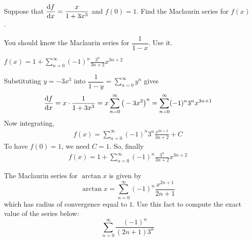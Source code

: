 \begin{Mquestion}[M105 2015A]\label{prob_s3.6modify2}
Suppose that $\displaystyle\diff{f}{x}=\frac{x}{1+3x^3}$ and $f(0)=1$.
Find the Maclaurin series for $f(x)$.
\end{Mquestion}

\begin{hint}
You should know the Maclaurin series for $\dfrac{1}{1-x}$. Use it.
\end{hint}

\begin{answer}
$f(x)  = 1+ \displaystyle\sum\limits_{n=0}^\infty (-1)^n  \frac{3^n }{3n+2} x^{3n+2}$
\end{answer}

\begin{solution}
Substituting $y=-3x^3$ into $\dfrac{1}{1-y} = \sum\limits_{n=0}^\infty y^n$
gives
\begin{align*}
\diff{f}{x} = x\cdot\frac{1}{1+3x^3}
=x\sum_{n=0}^\infty {\big(-3x^3\big)}^n
=\sum_{n=0}^\infty (-1)^n 3^n x^{3n+1}
\end{align*}
Now integrating,
\begin{align*}
f(x)  = \sum_{n=0}^\infty (-1)^n 3^n \frac{x^{3n+2}}{3n+2} +C
\end{align*}
To have $f(0)=1$, we need $C=1$. So, finally
\begin{align*}
f(x)  = 1+ \sum_{n=0}^\infty (-1)^n  \frac{3^n }{3n+2} x^{3n+2}
\end{align*}
\end{solution}


\begin{Mquestion}[M105 2012A]\label{prob_s3.6evaluate1}
The Maclaurin series for $\arctan x$ is given by
\begin{equation*}
\arctan x = \sum_{n=0}^\infty (-1)^n\frac{x^{2n+1}}{2n+1}
\end{equation*}
which has radius of convergence equal to $1$. Use this fact to compute
the exact value of the series below:
\begin{equation*}
\sum_{n=0}^\infty \frac{(-1)^n}{(2n+1) 3^n}
\end{equation*}
\end{Mquestion}


